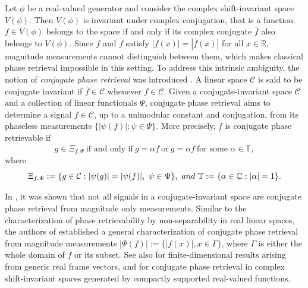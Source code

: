 \documentclass[11pt,oneside,reqno]{amsart}
\numberwithin{equation}{section}
\begin{document}
Let $\phi$ be a real-valued generator and consider the complex shift-invariant space $V(\phi)$. Then $V(\phi)$ is invariant under complex conjugation, that is a function
$f \in V(\phi)$ belongs to the space if and only if its complex conjugate
$\overline f$ also belongs to $V(\phi)$. 
Since $f$ and $\overline f$ satisfy
$|f(x)| = |\overline f(x)|$ for all $x \in \mathbb R$, magnitude  measurements
cannot distinguish between them, which makes classical phase retrieval impossible in
this setting. To address this intrinsic ambiguity, the notion of
\emph{conjugate phase retrieval} was introduced
\cite{Chen2022, CW23, Cheng2025, Lai, LLW21, Mcdonald}.
A linear space $\mathcal C$ is said to be conjugate invariant if
$\overline f \in \mathcal C$ whenever $f \in \mathcal C$. 
Given a conjugate-invariant space $\mathcal C$ and a collection of linear functionals $\Psi$, conjugate phase retrieval aims to determine a signal
$f \in \mathcal C$, up to a unimodular constant and conjugation, from its phaseless
measurements $\{ |\psi(f)| : \psi \in \Psi \}$.
More precisely, $f$ is conjugate phase retrievable if
\[
g \in \Xi_{f,\Psi}
\ \text{if and only if} \
g = \alpha f \ \text{or} \ g = \alpha \overline f
\ \text{for some } \alpha \in \mathbb T,
\]
where
\[
\Xi_{f,\Psi}
:= \{ g \in \mathcal C : |\psi(g)| = |\psi(f)|,\ \psi \in \Psi \},
 \ {\rm and } \ 
\mathbb T := \{ \alpha \in \mathbb C : |\alpha| = 1 \}.
\]



In \cite{Chen2022}, it was shown that not all signals in a conjugate-invariant space
are conjugate phase retrieval from magnitude only measurements.
Similar to the characterization of phase retrievability by non-separability in real
linear spaces, the authors of \cite{Chen2022} established a general characterization
of conjugate phase retrieval from magnitude measurements $|\Psi(f)|:=\{|f(x)|, x\in\Gamma\}$, where $\Gamma$ is either the whole domain  of $f$ or its subset.  See also \cite{Lai} for finite-dimensional results arising from generic real frame vectors, 
and \cite{CW23} for conjugate phase retrieval in complex shift-invariant spaces
generated by compactly supported real-valued functions.  
\end{document}
